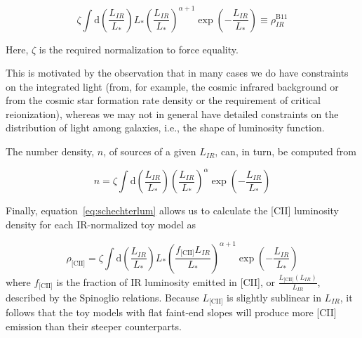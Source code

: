 \documentclass[12pt,preprint]{emulateapj}
\begin{document}
\begin{equation}
\zeta \int \textrm{d}\left(\frac{L_{IR}}{L_*}\right) L_* \left(\frac{L_{IR}}{L_*}\right)^{\alpha+1} \exp\left(-\frac{L_{IR}}{L_*}\right) \equiv \rho_{IR}^{\textrm{B11}}
\label{eq:schechterlum}
\end{equation}

Here, $\zeta$ is the required normalization to force equality. 

This is motivated by the observation that in many cases we do have constraints on the integrated light (from, for example, the cosmic infrared background or from the cosmic star formation rate density or the requirement of critical reionization), whereas we may not in general have detailed constraints on the distribution of light among galaxies, i.e., the shape of luminosity function.
 
The number density, $n$, of sources of a given $L_{IR}$, can, in turn, be computed from 

\begin{equation}
n = \zeta \int \textrm{d}\left(\frac{L_{IR}}{L_*}\right) \left(\frac{L_{IR}}{L_*}\right)^{\alpha}\exp\left(-\frac{L_{IR}}{L_*}\right)
\end{equation}

Finally, equation~\ref{eq:schechterlum} allows us to calculate the [CII] luminosity density for each IR-normalized toy model as

\begin{equation}
\rho_{\textrm{[CII]}} = \zeta \int \textrm{d}\left(\frac{L_{IR}}{L_*}\right) L_* \left(\frac{f_{\textrm{[CII]}}L_{IR}}{L_*}\right)^{\alpha+1} \exp\left(-\frac{L_{IR}}{L_*}\right) 
\end{equation}
where $f_{\textrm{[CII]}}$ is the fraction of IR luminosity emitted in [CII], or $\frac{L_{\textrm{[CII]}}(L_{IR})}{L_{IR}}$, described by the Spinoglio relations. Because $L_{\textrm{[CII]}}$ is slightly sublinear in $L_{IR}$, it follows that the toy models with flat faint-end slopes will produce more [CII] emission than their steeper counterparts. 


\end{document}
